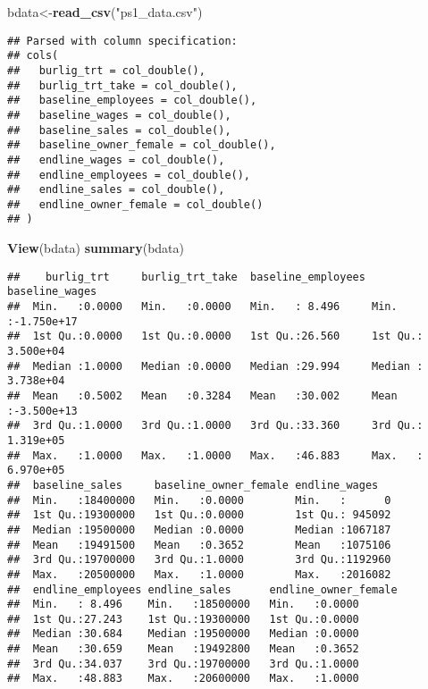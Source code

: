 \documentclass[]{article}
\newenvironment{Shaded}{\begin{snugshade}}{\end{snugshade}}
\newcommand{\KeywordTok}[1]{\textcolor[rgb]{0.13,0.29,0.53}{\textbf{#1}}}
\newcommand{\NormalTok}[1]{#1}
\newcommand{\StringTok}[1]{\textcolor[rgb]{0.31,0.60,0.02}{#1}}
\begin{document}
\begin{Shaded}
\begin{Highlighting}[]
\NormalTok{bdata<-}\KeywordTok{read_csv}\NormalTok{(}\StringTok{"ps1_data.csv"}\NormalTok{)}
\end{Highlighting}
\end{Shaded}

\begin{verbatim}
## Parsed with column specification:
## cols(
##   burlig_trt = col_double(),
##   burlig_trt_take = col_double(),
##   baseline_employees = col_double(),
##   baseline_wages = col_double(),
##   baseline_sales = col_double(),
##   baseline_owner_female = col_double(),
##   endline_wages = col_double(),
##   endline_employees = col_double(),
##   endline_sales = col_double(),
##   endline_owner_female = col_double()
## )
\end{verbatim}

\begin{Shaded}
\begin{Highlighting}[]
\KeywordTok{View}\NormalTok{(bdata)}
\KeywordTok{summary}\NormalTok{(bdata)}
\end{Highlighting}
\end{Shaded}

\begin{verbatim}
##    burlig_trt     burlig_trt_take  baseline_employees baseline_wages      
##  Min.   :0.0000   Min.   :0.0000   Min.   : 8.496     Min.   :-1.750e+17  
##  1st Qu.:0.0000   1st Qu.:0.0000   1st Qu.:26.560     1st Qu.: 3.500e+04  
##  Median :1.0000   Median :0.0000   Median :29.994     Median : 3.738e+04  
##  Mean   :0.5002   Mean   :0.3284   Mean   :30.002     Mean   :-3.500e+13  
##  3rd Qu.:1.0000   3rd Qu.:1.0000   3rd Qu.:33.360     3rd Qu.: 1.319e+05  
##  Max.   :1.0000   Max.   :1.0000   Max.   :46.883     Max.   : 6.970e+05  
##  baseline_sales     baseline_owner_female endline_wages    
##  Min.   :18400000   Min.   :0.0000        Min.   :      0  
##  1st Qu.:19300000   1st Qu.:0.0000        1st Qu.: 945092  
##  Median :19500000   Median :0.0000        Median :1067187  
##  Mean   :19491500   Mean   :0.3652        Mean   :1075106  
##  3rd Qu.:19700000   3rd Qu.:1.0000        3rd Qu.:1192960  
##  Max.   :20500000   Max.   :1.0000        Max.   :2016082  
##  endline_employees endline_sales      endline_owner_female
##  Min.   : 8.496    Min.   :18500000   Min.   :0.0000      
##  1st Qu.:27.243    1st Qu.:19300000   1st Qu.:0.0000      
##  Median :30.684    Median :19500000   Median :0.0000      
##  Mean   :30.659    Mean   :19492800   Mean   :0.3652      
##  3rd Qu.:34.037    3rd Qu.:19700000   3rd Qu.:1.0000      
##  Max.   :48.883    Max.   :20600000   Max.   :1.0000
\end{verbatim}
\end{document}
